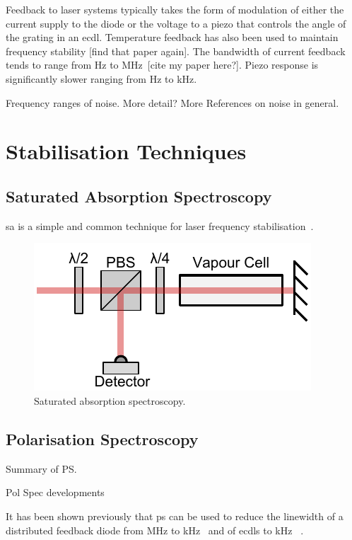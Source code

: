 Feedback to laser systems typically takes the form of modulation of either the current supply to the diode or the voltage to a piezo that controls the angle of the grating in an \gls{ecdl}.
Temperature feedback has also been used to maintain frequency stability {\color{red}[find that paper again]}.
The bandwidth of current feedback tends to range from \unit[0]{Hz} to MHz~\cite{ludlow_compact_2007}{\color{red}[cite my paper here?]}.
Piezo response is significantly slower ranging from \unit[0]{Hz} to \unit[100]{kHz}.

{\color{red}Frequency ranges of noise.}
{\color{red}More detail? More References on noise in general.}

\section{Stabilisation Techniques}
\subsection{Saturated Absorption Spectroscopy}
\Gls{sa} is a simple and common technique for laser frequency stabilisation~\cite{demtroder_laser_2003}.
 
\begin{figure}
\includegraphics[width=\linewidth]{part1/Figs/SatAbs.pdf}
\caption{Saturated absorption spectroscopy.}
\label{figure:satabs}
\end{figure}

\subsection{Polarisation Spectroscopy}

Summary of PS.

Pol Spec developments

It has been shown previously that \gls*{ps} can be used to reduce the linewidth of a distributed feedback diode from \unit[2]{MHz} to \unit[20]{kHz}~\cite{torii_laser-phase_2012} and of \glspl*{ecdl} to \unit[65]{kHz}
~\cite{yoshikawa_frequency_2003}.

